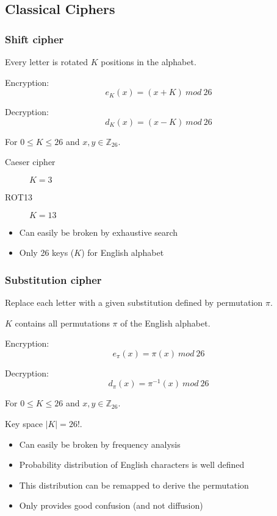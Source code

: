 \documentclass[a4paper]{article}
\begin{document}
\subsection{Classical Ciphers}

\subsubsection{Shift cipher}

Every letter is rotated $K$ positions in the alphabet.

Encryption:
\[
  e_{K}(x) = (x + K) \: mod \: 26
\]

Decryption:
\[
  d_{K}(x) = (x - K) \: mod \: 26
\]

For $0 \leq K \leq 26$ and $x, y \in \mathbb{Z}_{26}$.

\begin{description}
  \item[Caeser cipher]
    $K=3$
  \item[ROT13]
    $K=13$
\end{description}


\begin{itemize}
  \item Can easily be broken by exhaustive search
  \item Only 26 keys ($K$) for English alphabet
\end{itemize}

\subsubsection{Substitution cipher}

Replace each letter with a given substitution defined by permutation $\pi$.

$K$ contains all permutations $\pi$ of the English alphabet.

Encryption:
\[
  e_{\pi}(x) = \pi(x) \: mod \: 26
\]

Decryption:
\[
  d_{\pi}(x) = \pi^{-1}(x) \: mod \: 26
\]

For $0 \leq K \leq 26$ and $x, y \in \mathbb{Z}_{26}$.

Key space $|K| = 26!$.


\begin{itemize}
  \item Can easily be broken by frequency analysis
  \item Probability distribution of English characters is well defined
  \item This distribution can be remapped to derive the permutation
  \item Only provides good confusion (and not diffusion)
\end{itemize}
\end{document}
